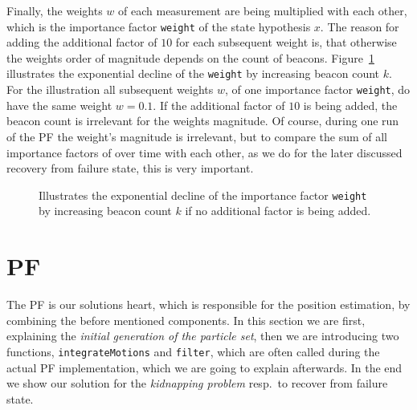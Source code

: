 Finally, the weights $w$ of each measurement are being multiplied with each other, which is the importance factor \texttt{weight} of the state hypothesis $x$. The reason for adding the additional factor of $10$ for each subsequent weight is, that otherwise the weights order of magnitude depends on the count of beacons. Figure~\ref{fig:addWeightFactor} illustrates the exponential decline of the \texttt{weight} by increasing beacon count $k$. For the illustration all subsequent weights $w$, of one importance factor \texttt{weight}, do have the same weight  $w = 0.1$. If the additional factor of $10$ is being added, the beacon count is irrelevant for the weights magnitude. Of course, during one run of the \acl{PF} the weight's magnitude is irrelevant, but to compare the sum of all importance factors of over time with each other, as we do for the later discussed recovery from failure state, this is very important.

\begin{figure}


\caption{Illustrates the exponential decline of the importance factor \texttt{weight} by increasing beacon count $k$ if no additional factor is being added.}
\label{fig:addWeightFactor}
\end{figure}


\section{\acl{PF}}
The \acl{PF} is our solutions heart, which is responsible for the position estimation, by combining the before mentioned components. In this section we are first, explaining the \emph{initial generation of the particle set}, then we are introducing two functions, \texttt{integrateMotions} and \texttt{filter}, which are often called during the actual \acs{PF} implementation, which we are going to explain afterwards. In the end we show our solution for the \emph{kidnapping problem} resp.\ to recover from failure state.


